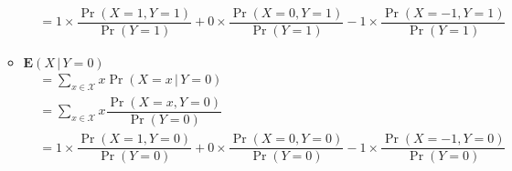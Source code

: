 \documentclass[answers]{exam}
\begin{document}
\begin{questions}
\begin{solution}
\begin{enumerate}[(1)]
\begin{itemize}
\begin{align}
            &= 1\times \dfrac{\Pr(X=1,Y=1)}{\Pr(Y=1)}+0\times\dfrac{\Pr(X=0,Y=1)}{\Pr(Y=1)}-1\times\dfrac{\Pr(X=-1,Y=1)}{\Pr(Y=1)}
          \end{align}
          \item $\mathbf{E}(X\,|\,Y=0)$
          \begin{align}
            &= \sum_{x\in\mathcal{X}}x\Pr(X=x\,|\,Y=0)\\
            &= \sum_{x\in \mathcal{X}}x\dfrac{\Pr(X=x,Y=0)}{\Pr(Y=0)}\\
            &= 1\times \dfrac{\Pr(X=1,Y=0)}{\Pr(Y=0)}+0\times\dfrac{\Pr(X=0,Y=0)}{\Pr(Y=0)}-1\times\dfrac{\Pr(X=-1,Y=0)}{\Pr(Y=0)}
          \end{align}
      \end{itemize}
    \end{enumerate}
  \end{solution}
\end{questions}
\end{document}
